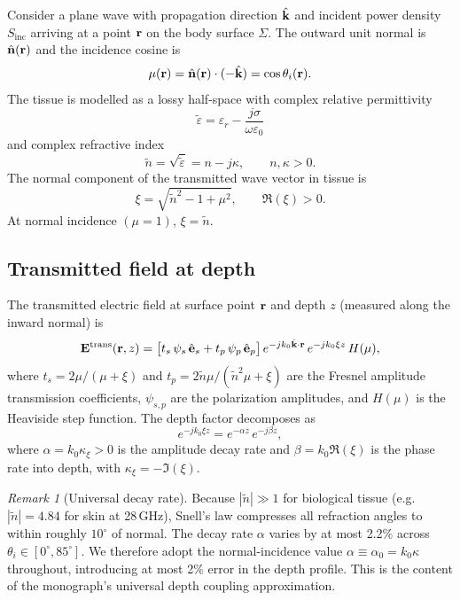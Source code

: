 \documentclass[11pt,a4paper]{article}
\theoremstyle{definition}
\theoremstyle{remark}
\newtheorem{remark}[theorem]{Remark}
\newcommand{\Sinc}{S_{\mathrm{inc}}}
\newcommand{\nhat}{\hat{\vb{n}}}
\newcommand{\khat}{\hat{\vb{k}}}
\newcommand{\ntilde}{\tilde{n}}
\newcommand{\epstilde}{\tilde{\varepsilon}}
\begin{document}
Consider a plane wave with propagation direction $\khat$ and incident power
density $\Sinc$ arriving at a point $\vb{r}$ on the body surface $\Sigma$.
The outward unit normal is $\nhat(\vb{r})$ and the incidence cosine is
\begin{equation}\label{eq:mu-def}
  \mu(\vb{r}) = \nhat(\vb{r}) \cdot (-\khat) = \cos\theta_i(\vb{r}).
\end{equation}
The tissue is modelled as a lossy half-space with complex relative permittivity
\begin{equation}\label{eq:eps-complex}
  \epstilde = \varepsilon_r - \frac{j\sigma}{\omega\varepsilon_0}
\end{equation}
and complex refractive index
\begin{equation}\label{eq:ntilde}
  \ntilde = \sqrt{\epstilde} = n - j\kappa, \qquad n, \kappa > 0.
\end{equation}
The normal component of the transmitted wave vector in tissue is
\begin{equation}\label{eq:xi-def}
  \xi = \sqrt{\ntilde^2 - 1 + \mu^2}, \qquad \Re(\xi) > 0.
\end{equation}
At normal incidence $(\mu = 1)$, $\xi = \ntilde$.

\subsection{Transmitted field at depth}

The transmitted electric field at surface point $\vb{r}$ and depth $z$
(measured along the inward normal) is
\begin{equation}\label{eq:Etrans}
  \vb{E}^{\mathrm{trans}}(\vb{r}, z)
  = \bigl[t_s\,\psi_s\,\hat{\vb{e}}_s + t_p\,\psi_p\,\hat{\vb{e}}_p\bigr]\,
    e^{-jk_0\khat\cdot\vb{r}}\,e^{-jk_0\xi z}\,H(\mu),
\end{equation}
where $t_s = 2\mu/(\mu + \xi)$ and $t_p = 2\ntilde\mu/(\ntilde^2\mu + \xi)$
are the Fresnel amplitude transmission coefficients, $\psi_{s,p}$ are the
polarization amplitudes, and $H(\mu)$ is the Heaviside step function.
The depth factor decomposes as
\begin{equation}\label{eq:depth-factor}
  e^{-jk_0\xi z} = e^{-\alpha z}\,e^{-j\beta z},
\end{equation}
where $\alpha = k_0\kappa_\xi > 0$ is the amplitude decay rate and
$\beta = k_0\Re(\xi)$ is the phase rate into depth, with
$\kappa_\xi = -\Im(\xi)$.

\begin{remark}[Universal decay rate]\label{rem:universal-alpha}
Because $|\ntilde| \gg 1$ for biological tissue (e.g.\ $|\ntilde| = 4.84$ for
skin at 28\,GHz), Snell's law compresses all refraction angles to within roughly
$10^\circ$ of normal. The decay rate $\alpha$ varies by at most 2.2\% across
$\theta_i \in [0^\circ, 85^\circ]$. We therefore adopt the normal-incidence
value $\alpha \equiv \alpha_0 = k_0\kappa$ throughout, introducing at most 2\%
error in the depth profile. This is the content of the monograph's universal
depth coupling approximation.
\end{remark}
\end{document}
